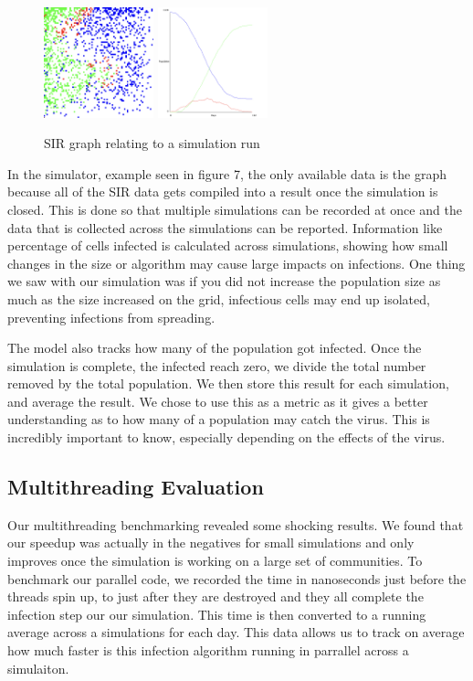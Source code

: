 \documentclass[conference]{IEEEtran}
\begin{document}
\begin{figure}[!hbt]
\centering
\includegraphics[width=1.25in]{Figures/Single Community Simulation Photo.png}
\includegraphics[width=1.25in]{Figures/SIR generated graph.png}
\caption{SIR graph relating to a simulation run}
\label{fig_sim}
\end{figure}

In the simulator, example seen in figure 7, the only available data is the graph because all of the SIR data gets compiled into a result once the simulation is closed. This is done so that multiple simulations can be recorded at once and the data that is collected across the simulations can be reported. Information like percentage of cells infected is calculated across simulations, showing how small changes in the size or algorithm may cause large impacts on infections. One thing we saw with our simulation was if you did not increase the population size as much as the size increased on the grid, infectious cells may end up isolated, preventing infections from spreading.

The model also tracks how many of the population got infected. Once the simulation is complete, the infected reach zero, we divide the total number removed by the total population. We then store this result for each simulation, and average the result. We chose to use this as a metric as it gives a better understanding as to how many of a population may catch the virus. This is incredibly important to know, especially depending on the effects of the virus.

\subsection{Multithreading Evaluation}

Our multithreading benchmarking revealed some shocking results. We found that our speedup was actually in the negatives for small simulations and only improves once the simulation is working on a large set of communities. To benchmark our parallel code, we recorded the time in nanoseconds just before the threads spin up, to just after they are destroyed and they all complete the infection step our our simulation. This time is then converted to a running average across a simulations for each day. This data allows us to track on average how much faster is this infection algorithm running in parrallel across a simulaiton.
\end{document}
